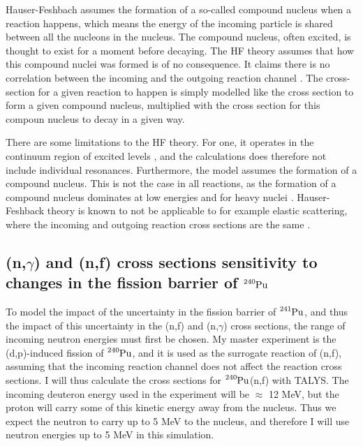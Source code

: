 \documentclass[]{article}
\begin{document}
 \noindent Hauser-Feshbach assumes the formation of a so-called compound nucleus when a reaction happens, which means the energy of the incoming particle is shared between all the nucleons in the nucleus. The compound nucleus, often excited, is thought to exist for a moment before decaying. The HF theory assumes that how this compound nuclei was formed is of no consequence. It claims there is no correlation between the incoming and the outgoing reaction channel \cite{Goriely2017}. The cross-section for a given reaction to happen is simply modelled like the cross section to form a given compound nucleus, multiplied with the cross section for this compoun nucleus to decay in a given way. 
\par 
\vspace{3mm}

 \noindent There are some limitations to the HF theory. For one, it operates in the continuum region of excited levels \cite{Goriely2017}, and the calculations does therefore not include individual resonances. Furthermore, the model assumes the formation of a compound nucleus. This is not the case in all reactions, as the formation of a compound nucleus dominates at low energies and for heavy nuclei \cite{Goriely2017}. Hauser-Feshback theory is known to not be applicable to for example elastic scattering, where the incoming and outgoing reaction cross sections are the same  \cite{Goriely2017}.


\subsection{(n,$\gamma$) and (n,f) cross sections sensitivity to changes in the fission barrier of $\ce{^{240}Pu}$}


To model the impact of the uncertainty in the fission barrier of $\ce{^{241}Pu}$, and thus the impact of this uncertainty in the (n,f) and (n,$\gamma$) cross sections, the range of incoming neutron energies must first be chosen. My master experiment is the (d,p)-induced fission of $\ce{^{240}Pu}$, and it is used as the surrogate reaction of (n,f), assuming that the incoming reaction channel does not affect the reaction cross sections. I will thus calculate the cross sections for $\ce{^{240}Pu}$(n,f) with TALYS. The incoming deuteron energy used in the experiment will be $\approx$ 12 MeV, but the proton will carry some of this kinetic energy away from the nucleus. Thus we expect the neutron to carry up to 5 MeV to the nucleus, and therefore I will use neutron energies up to 5 MeV in this simulation. 
\par 
\vspace{3mm}
\end{document}
